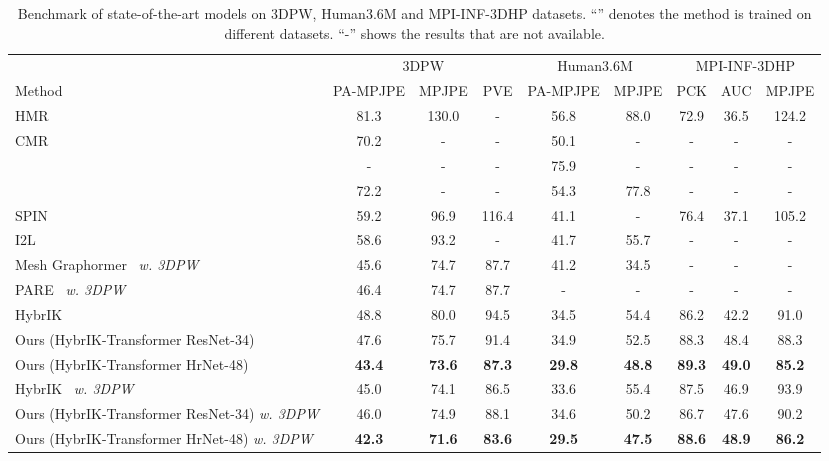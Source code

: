 \documentclass[sigconf,final]{acmart}
\begin{document}
\begin{table*}[!b]
    \begin{center}
    \resizebox{\textwidth}{!}
    {\begin{tabular}{l|ccc|cc|ccc}
        \toprule
        & \multicolumn{3}{c}{3DPW} & \multicolumn{2}{c}{Human3.6M} & \multicolumn{3}{c}{MPI-INF-3DHP} \\
        \cmidrule(lr){2-4} \cmidrule(lr){5-6} \cmidrule(lr){7-9}
        Method & PA-MPJPE  & MPJPE  & PVE  & PA-MPJPE  & MPJPE  & PCK  & AUC  & MPJPE  \\
        \midrule
        HMR~\cite{hmr} & 81.3 &  130.0 &  - &  56.8 &  88.0 &  72.9 &  36.5 &  124.2 \\
        CMR~\cite{cmr} & 70.2 & - & - & 50.1 & - & - & - & - \\
        \citet{pavlakos2018learning} &  - &  - &  - &  75.9 &  - &  - &  - &  - \\
        \citet{arnab2019exploiting} & 72.2 & - & - & 54.3 & 77.8 & - & - & - \\
         SPIN~\cite{spin} &  59.2 &  96.9 &  116.4 &  41.1 &  - &  76.4 &  37.1 &  105.2 \\
        I2L~\cite{i2l} & 58.6 & 93.2 & - & 41.7 & 55.7 & - & - & - \\
         Mesh Graphormer~\cite{lin2021mesh} \textit{w. 3DPW} &  45.6 &  74.7 &  87.7 &  41.2 &  34.5 &  - &  - &  - \\
        PARE~\cite{kocabas2021pare} \textit{w. 3DPW} & 46.4 & 74.7 & 87.7 & - & - & - & - & - \\
        \midrule
        HybrIK~\cite{li2021hybrik} & {48.8} & {80.0} & {94.5} & 34.5 & 54.4 & {86.2} & {42.2} & {91.0} \\
        Ours (HybrIK-Transformer ResNet-34) & 47.6 & 75.7 & 91.4 & 34.9 & 52.5 & 88.3 & 48.4 & 88.3 \\
        Ours (HybrIK-Transformer HrNet-48) & \textbf{43.4} & \textbf{73.6} & \textbf{87.3} & \textbf{29.8} & \textbf{48.8} & \textbf{89.3} & \textbf{49.0} & \textbf{85.2} \\
        \midrule
        HybrIK~\cite{li2021hybrik} \textit{w. 3DPW} & 45.0 & 74.1 & 86.5 & 33.6 & {55.4} & 87.5 & {46.9} & {93.9} \\
        Ours (HybrIK-Transformer ResNet-34) \textit{w. 3DPW} & {46.0} & {74.9} & {88.1} & {34.6} & 50.2 & {86.7} & 47.6 & 90.2 \\
        Ours (HybrIK-Transformer HrNet-48) \textit{w. 3DPW}  & \textbf{42.3} & \textbf{71.6} & \textbf{83.6} & \textbf{29.5} & \textbf{47.5} & \textbf{88.6} & \textbf{48.9} & \textbf{86.2} \\
        \bottomrule
        \end{tabular}
        


    }
    \end{center}
\caption{Benchmark of state-of-the-art models on 3DPW, Human3.6M and MPI-INF-3DHP datasets. ``'' denotes the method is trained on different datasets. ``-'' shows the results that are not available.}
    \label{tab:key_results}
    \vspace{-3mm}
\end{table*}
\end{document}
